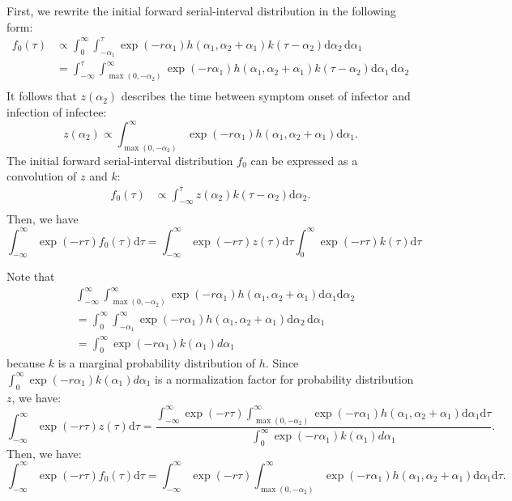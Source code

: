 \documentclass[12pt]{article}
\newcommand{\pinf}{\ensuremath{\alpha_1}} %
\newcommand{\sinf}{\ensuremath{\alpha_2}} %
\begin{document}
First, we rewrite the initial forward serial-interval distribution in the following form:
\begin{equation}
\begin{aligned}
f_{0}(\tau) &\propto \int_0^\infty \int_{-\pinf}^{\tau} \exp(-r\pinf) h(\pinf, \sinf + \pinf) k(\tau - \sinf) \mathrm{d}\sinf\,\mathrm{d}\pinf\\
&= \int_{-\infty}^{\tau} \int_{\max{(0,-\sinf)}}^{\infty} \exp(-r\pinf) h(\pinf, \sinf + \pinf)k(\tau - \sinf)\mathrm{d}\pinf\, \mathrm{d}\sinf\\
\end{aligned}
\end{equation}
It follows that $z(\sinf)$ describes the time between symptom onset of infector and infection of infectee:
\begin{equation}
z(\sinf) \propto \int_{\max{(0,-\sinf)}}^{\infty} \exp(-r\pinf) h(\pinf, \sinf + \pinf) \mathrm{d}\pinf.
\end{equation}
The initial forward serial-interval distribution $f_0$ can be expressed as a convolution of $z$ and $k$:
\begin{equation}
\begin{aligned}
f_{0}(\tau) &\propto \int_{-\infty}^{\tau} z(\sinf) k(\tau - \sinf) \mathrm{d}\sinf.\\
\end{aligned}
\end{equation}
Then, we have
\begin{equation}
\int_{-\infty}^\infty \exp(-r\tau) f_{0}(\tau) \mathrm{d} \tau = \int_{-\infty}^\infty \exp(-r\tau) z(\tau) \mathrm{d} \tau \int_{0}^\infty \exp(-r\tau) k(\tau) \mathrm{d} \tau
\end{equation}

Note that 
\begin{equation}
\begin{aligned}
&\int_{-\infty}^\infty \int_{\max{(0,-\sinf)}}^{\infty} \exp(-r\pinf) h(\pinf, \sinf + \pinf) \mathrm{d}\pinf \mathrm{d}\sinf\\
&= \int_{0}^\infty \int_{-\pinf}^\infty \exp(- r \pinf) h(\pinf, \sinf+\pinf) \mathrm{d}\sinf\,\mathrm{d} \pinf\\
&= \int_{0}^\infty \exp(- r \pinf) k(\pinf) d\pinf
\end{aligned}
\end{equation}
because $k$ is a marginal probability distribution of $h$.
Since $\int_{0}^\infty \exp(- r \pinf) k(\pinf) d\pinf$ is a normalization factor for probability distribution $z$, we have:
\begin{equation}
\int_{-\infty}^\infty \exp(-r\tau) z(\tau) \mathrm{d} \tau = \frac{\int_{-\infty}^\infty \exp(-r\tau) \int_{\max{(0,-\sinf)}}^{\infty} \exp(-r\pinf) h(\pinf, \sinf + \pinf) \mathrm{d}\pinf \mathrm{d}\tau}{\int_{0}^\infty \exp(- r \pinf) k(\pinf) d\pinf}.
\end{equation}
Then, we have:
\begin{equation}
\int_{-\infty}^\infty \exp(-r\tau) f_{0}(\tau) \mathrm{d} \tau = \int_{-\infty}^\infty \exp(-r\tau) \int_{\max{(0,-\sinf)}}^{\infty} \exp(-r\pinf) h(\pinf, \sinf + \pinf) \mathrm{d}\pinf \mathrm{d}\tau.
\end{equation}
\end{document}
